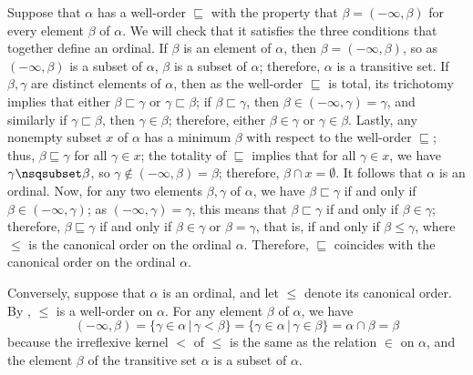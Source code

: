 \documentclass{article}
\begin{document}
Suppose that \(\alpha\) has a well-order \(\sqsubseteq\) with the
property that \(\beta = (-\infty, \beta)\) for every element \(\beta\)
of \(\alpha\).  We will check that it satisfies the three conditions
that together define an ordinal.  If \(\beta\) is an element of
\(\alpha\), then \(\beta = (-\infty, \beta)\), so as
\((-\infty, \beta)\) is a subset of \(\alpha\), \(\beta\) is a subset
of \(\alpha\); therefore, \(\alpha\) is a transitive set.  If
\(\beta, \gamma\) are distinct elements of \(\alpha\), then as the
well-order \(\sqsubseteq\) is total, its trichotomy implies that
either \(\beta \sqsubset \gamma\) or \(\gamma \sqsubset \beta\); if
\(\beta \sqsubset \gamma\), then
\(\beta \in (-\infty, \gamma) = \gamma\), and similarly if
\(\gamma \sqsubset \beta\), then \(\gamma \in \beta\); therefore,
either \(\beta \in \gamma\) or \(\gamma \in \beta\).  Lastly, any
nonempty subset \(x\) of \(\alpha\) has a minimum \(\beta\) with
respect to the well-order \(\sqsubseteq\); thus,
\(\beta \sqsubseteq \gamma\) for all \(\gamma \in x\); the totality of
\(\sqsubseteq\) implies that for all \(\gamma \in x\), we have
\(\gamma \nsqsubset \beta\), so \(\gamma \notin (-\infty, \beta) =
\beta\); therefore, \(\beta \cap x = \emptyset\).  It follows that
\(\alpha\) is an ordinal.  Now, for any two elements \(\beta, \gamma\)
of \(\alpha\), we have \(\beta \sqsubset \gamma\) if and only if
\(\beta \in (-\infty, \gamma)\); as \((-\infty, \gamma) = \gamma\),
this means that \(\beta \sqsubset \gamma\) if and only if \(\beta \in
\gamma\); therefore, \(\beta \sqsubseteq \gamma\) if and only if
\(\beta \in \gamma\) or \(\beta = \gamma\), that is, if and only if
\(\beta \leq \gamma\), where \(\leq\) is the canonical order on the
ordinal \(\alpha\).  Therefore, \(\sqsubseteq\) coincides with the
canonical order on the ordinal \(\alpha\).

Conversely, suppose that \(\alpha\) is an ordinal, and let \(\leq\)
denote its canonical order.  By , \(\leq\) is a
well-order on \(\alpha\).  For any element \(\beta\) of \(\alpha\), we
have
\begin{displaymath}
  (-\infty, \beta) =
  \{ \gamma \in \alpha \,\vert\, \gamma < \beta \} =
  \{ \gamma \in \alpha \,\vert\, \gamma \in \beta \} =
  \alpha \cap \beta = \beta
\end{displaymath}
because the irreflexive kernel \(<\) of \(\leq\) is the same as the
relation \(\in\) on \(\alpha\), and the element \(\beta\) of the
transitive set \(\alpha\) is a subset of \(\alpha\).
\end{document}
